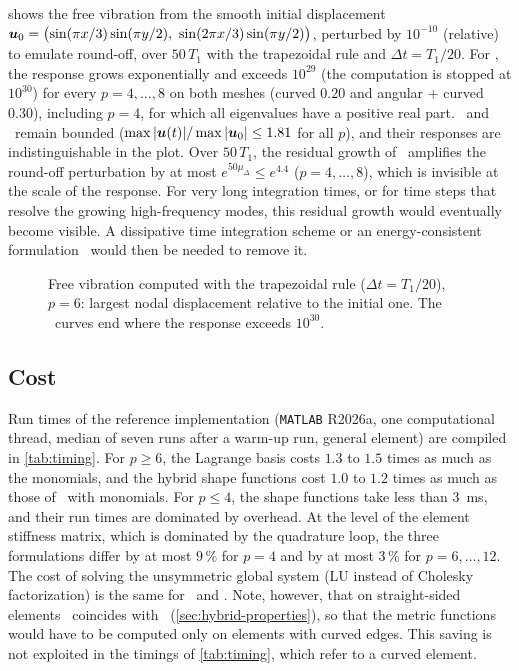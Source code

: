  shows the free vibration from the smooth initial displacement $\vect u_0=\bigl(\sin(\pi x/3)\sin(\pi y/2),\ \sin(2\pi x/3)\sin(\pi y/2)\bigr)$, perturbed by $10^{-10}$ (relative) to emulate round-off, over $50\,T_1$ with the trapezoidal rule and $\Delta t=T_1/20$. For \PM, the response grows exponentially and exceeds $10^{29}$ (the computation is stopped at $10^{30}$) for every $p=4,\dots,8$ on both meshes (curved $0.20$ and angular + curved $0.30$), including $p=4$, for which all eigenvalues have a positive real part. \PH\ and \PP\ remain bounded ($\max|\bm{u}(t)|/\max|\bm{u}_0|\le1.81$ for all $p$), and their responses are indistinguishable in the plot. Over $50\,T_1$, the residual growth of \PH\ amplifies the round-off perturbation by at most $e^{50\mu_\Delta}\le e^{4.4}$ ($p=4,\dots,8$), which is invisible at the scale of the response. For very long integration times, or for time steps that resolve the growing high-frequency modes, this residual growth would eventually become visible. A dissipative time integration scheme or an energy-consistent formulation~\cite{Wang2022Temporal,Zaehringer2026On} would then be needed to remove it.

\begin{figure}[htbp]
  \centering
  
  \caption{Free vibration computed with the trapezoidal rule ($\Delta t=T_1/20$), $p=6$: largest nodal displacement relative to the initial one. The \PM\ curves end where the response exceeds $10^{30}$.}
  \label{fig:transient}
\end{figure}
%
\subsection{Cost}
\label{sec:num-cost}
%
Run times of the reference implementation (\texttt{MATLAB} R2026a, one computational thread, median of seven runs after a warm-up run, general element) are compiled in \cref{tab:timing}. For $p\ge6$, the Lagrange basis costs $1.3$ to $1.5$ times as much as the monomials, and the hybrid shape functions cost $1.0$ to $1.2$ times as much as those of \PM\ with monomials. For $p\le4$, the shape functions take less than $3$~ms, and their run times are dominated by overhead. At the level of the element stiffness matrix, which is dominated by the quadrature loop, the three formulations differ by at most $9\,\%$ for $p=4$ and by at most $3\,\%$ for $p=6,\dots,12$. The cost of solving the unsymmetric global system (LU instead of Cholesky factorization) is the same for \PM\ and \PH. Note, however, that on straight-sided elements \PH\ coincides with \PP\ (\cref{sec:hybrid-properties}), so that the metric functions would have to be computed only on elements with curved edges. This saving is not exploited in the timings of \cref{tab:timing}, which refer to a curved element.

